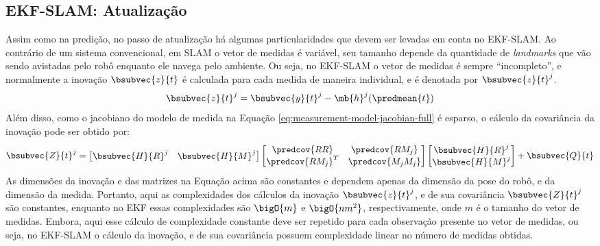 \subsection{EKF-SLAM: Atualização}
\label{sec:ekf-slam-update}
Assim como na predição, no passo de atualização há algumas particularidades 
que devem ser levadas em conta no EKF-SLAM. Ao contrário de um sistema convencional, em SLAM o vetor de medidas é variável, seu tamanho depende da 
quantidade de \textit{landmarks} que vão sendo avistadas pelo robô enquanto 
ele navega pelo ambiente. Ou seja, no EKF-SLAM o vetor de medidas é sempre 
``incompleto'', e normalmente a inovação $\bsubvec{z}{t}$ é calculada para cada 
medida de maneira individual, e é denotada por $\bsubvec{z}{t}^j$.
\begin{equation}
  \bsubvec{z}{t}^j = \bsubvec{y}{t}^j - \mb{h}^j(\predmean{t})
  \label{eq:ekf-slam-innovation}
\end{equation}
Além disso, como o jacobiano do modelo de medida na Equação \ref{eq:measurement-model-jacobian-full} é esparso, o cálculo da covariância da inovação pode ser obtido por:
\renewcommand{\arraystretch}{1.5}
\begin{equation}
  \bsubvec{Z}{t}^j = \begin{bmatrix}
    \bsubvec{H}{R}^j & \bsubvec{H}{M}^j
  \end{bmatrix}
  \begin{bmatrix}
    \predcov{RR} & \predcov{RM_j} \\
    \predcov{RM_j}^T & \predcov{M_j M_j}
  \end{bmatrix}
  \begin{bmatrix}
    \bsubvec{H}{R}^j \\ \bsubvec{H}{M}^j
  \end{bmatrix} + \bsubvec{Q}{t}
  \label{eq:ekf-slam-innovation-covariance}
\end{equation}
\renewcommand{\arraystretch}{1.0}
As dimensões da inovação e das matrizes na Equação acima são constantes e dependem apenas da dimensão da pose do robô, e da dimensão da medida. 
Portanto, aqui as complexidades dos cálculos da inovação $\bsubvec{z}{t}^j$, e de sua covariância $\bsubvec{Z}{t}^j$ são constantes, enquanto no EKF essas complexidades são $\bigO{m}$ e $\bigO{nm^2}$, respectivamente, onde $m$ é o tamanho do vetor de medidas. Embora, aqui esse cálculo de complexidade constante deve ser repetido para cada observação presente no vetor de medidas, ou seja, no EKF-SLAM o cálculo da
inovação, e de sua covariância possuem complexidade linear no número de medidas obtidas.

